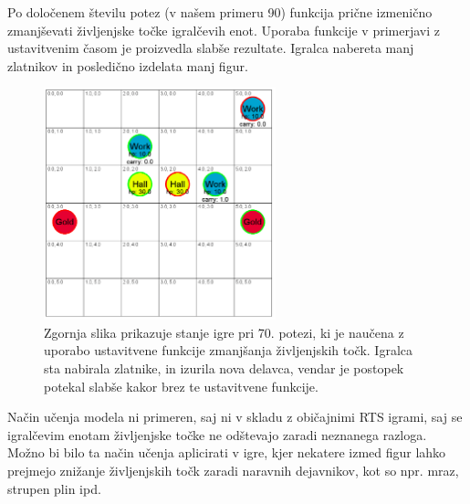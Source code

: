 \documentclass[a4paper, 12pt]{book}
\begin{document}
{Po določenem številu potez (v našem primeru 90) funkcija prične izmenično zmanjševati življenjske točke igralčevih enot.
Uporaba funkcije v primerjavi z ustavitvenim časom je proizvedla slabše rezultate.
Igralca nabereta manj zlatnikov in posledično izdelata manj figur.

\begin{figure}[h!]
	\begin{center}
		\includegraphics[width=0.6\textwidth]{photos/killFunction.pdf}
	\end{center}
	\caption{Zgornja slika prikazuje stanje igre pri 70. potezi, ki je naučena z uporabo ustavitvene funkcije zmanjšanja življenjskih točk. 
		Igralca sta nabirala zlatnike, in izurila nova delavca, vendar je postopek potekal slabše kakor brez te ustavitvene funkcije. }
	\label{vizualizacijaRezultatovKillFunction}
\end{figure}

Način učenja modela ni primeren, saj ni v skladu z običajnimi RTS igrami, saj se igralčevim enotam življenjske točke ne odštevajo zaradi neznanega razloga.
Možno bi bilo ta način učenja aplicirati v igre, kjer nekatere izmed figur lahko prejmejo znižanje življenjskih točk zaradi naravnih dejavnikov, kot so npr. mraz, strupen plin ipd.

}
\end{document}
